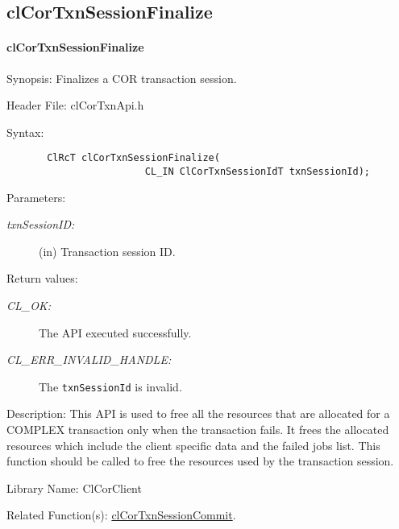 \begin{flushleft}
\subsection{clCorTxnSessionFinalize}
\hypertarget{pagecor142}{}\paragraph{cl\-Cor\-Txn\-Session\-Finalize}\label{pagecor142}
\begin{Desc}
\item[Synopsis:] Finalizes a COR transaction session.\end{Desc}
\begin{Desc}
\item[Header File:]clCorTxnApi.h\end{Desc}
\begin{Desc}
\item[Syntax:]

\footnotesize\begin{verbatim}       ClRcT clCorTxnSessionFinalize( 
						CL_IN ClCorTxnSessionIdT txnSessionId);
\end{verbatim}
\normalsize
\end{Desc}
\begin{Desc}
\item[Parameters:]
\begin{description}
\item[{\em txn\-Session\-ID:}](in) Transaction session ID.\end{description}
\end{Desc}
\begin{Desc}
\item[Return values:]
\begin{description}
\item[{\em CL\_\-OK:}]The API executed successfully.
\item[{\em CL\_\-ERR\_\-INVALID\_\-HANDLE:}] The {\tt{txnSessionId}} is invalid.

\end{description}
\end{Desc}
\begin{Desc}
\item[Description:] This API is used to free all the resources that are allocated for a COMPLEX transaction only when the transaction fails. 
It frees the allocated resources which include the client specific data and the failed jobs list. This function should be called to
free the resources used by the transaction session.
\end{Desc}
\begin{Desc}
\item[Library Name:]Cl\-Cor\-Client\end{Desc}
\begin{Desc}
\item[Related Function(s):]\hyperlink{pagecor140}{cl\-Cor\-Txn\-Session\-Commit}. \end{Desc}
\newpage






\end{flushleft}
